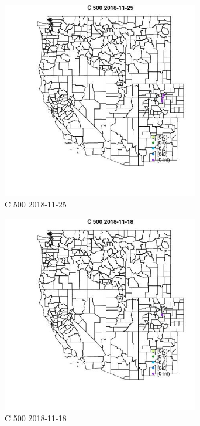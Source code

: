 \begin{figure} 
\centering  
\includegraphics[width=0.77\textwidth]{Code_Outputs/Report_ML_input_PM25_Step4_part_e_de_duplicated_aveswNAs_MapObsC_5002018-11-25.jpg} 
\caption{\label{fig:Report_ML_input_PM25_Step4_part_e_de_duplicated_aveswNAsMapObsC_5002018-11-25}C 500 2018-11-25} 
\end{figure} 
 

\begin{figure} 
\centering  
\includegraphics[width=0.77\textwidth]{Code_Outputs/Report_ML_input_PM25_Step4_part_e_de_duplicated_aveswNAs_MapObsC_5002018-11-18.jpg} 
\caption{\label{fig:Report_ML_input_PM25_Step4_part_e_de_duplicated_aveswNAsMapObsC_5002018-11-18}C 500 2018-11-18} 
\end{figure} 
 

